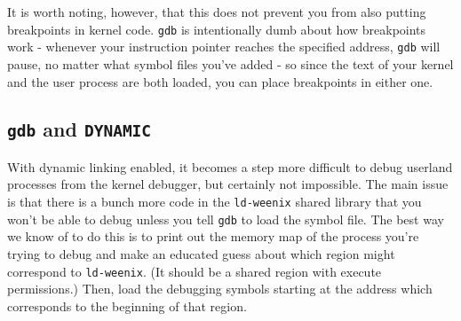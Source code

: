 It is worth noting, however, that this does not prevent you from also putting breakpoints in kernel code. \texttt{gdb} is intentionally dumb about how breakpoints work - whenever your instruction pointer reaches the specified address, \texttt{gdb} will pause, no matter what symbol files you've added - so since the text of your kernel and the user process are both loaded, you can place breakpoints in either one.

\subsection{\texttt{gdb} and \texttt{DYNAMIC}}

With dynamic linking enabled, it becomes a step more difficult to debug userland processes from the kernel debugger, but certainly not impossible. The main issue is that there is a bunch more code in the \texttt{ld-weenix} shared library that you won't be able to debug unless you tell \texttt{gdb} to load the symbol file. The best way we know of to do this is to print out the memory map of the process you're trying to debug and make an educated guess about which region might correspond to \texttt{ld-weenix}. (It should be a shared region with execute permissions.) Then, load the debugging symbols starting at the address which corresponds to the beginning of that region.
